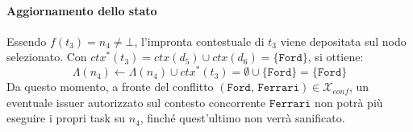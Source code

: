 \paragraph{Aggiornamento dello stato} Essendo $f(t_3) = n_4 \neq \bot$, l'impronta contestuale di $t_3$ viene depositata sul nodo selezionato. Con $ctx^*(t_3) = ctx(d_5) \cup ctx(d_6) = \{\mathtt{Ford}\}$, si ottiene:
\begin{equation}
    \Lambda(n_4) \leftarrow \Lambda(n_4) \cup ctx^*(t_3) = \emptyset \cup \{\mathtt{Ford}\} = \{\mathtt{Ford}\}
\end{equation}
Da questo momento, a fronte del conflitto $(\mathtt{Ford},\, \mathtt{Ferrari}) \in \mathcal{X}_{conf}$, un eventuale issuer autorizzato sul contesto concorrente $\mathtt{Ferrari}$ non potrà più eseguire i propri task su $n_4$, finché quest'ultimo non verrà sanificato.